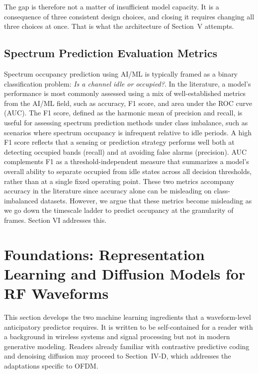 \documentclass[lettersize,journal]{IEEEtran}
\begin{document}
The gap is therefore not a matter of insufficient model capacity. It is
a consequence of three consistent design choices, and closing it
requires changing all three choices at once. That is what the architecture of
Section~V attempts.

\subsection{\textbf{Spectrum Prediction Evaluation Metrics}}
Spectrum occupancy prediction using AI/ML is typically framed as a binary 
classification problem: \textit{Is a channel idle or occupied?}. In 
the literature, a model's performance is most commonly assessed using 
a mix of well-established metrics from the AI/ML field, such as accuracy, 
F1 score, and area under the ROC curve (AUC). The F1 score, defined as 
the harmonic mean of precision and recall, is useful for assessing spectrum 
prediction methods under class imbalance, such as scenarios where spectrum 
occupancy is infrequent relative to idle periods. A high F1 score reflects 
that a sensing or prediction strategy performs well both at 
detecting occupied bands (recall) and at avoiding false alarms (precision). 
AUC complements F1 as a threshold-independent measure that summarizes a 
model's overall ability to separate occupied from idle states across 
all decision thresholds, rather than at a single fixed operating point. 
These two metrics accompany accuracy in the literature since accuracy 
alone can be misleading on class-imbalanced datasets. However, we argue 
that these metrics become misleading as we go down the timescale ladder 
to predict occupancy at the granularity of frames. Section VI addresses this.

\section{\textbf{Foundations: Representation Learning and Diffusion Models for RF Waveforms}}

This section develops the two machine learning ingredients that a
waveform-level anticipatory predictor requires. It is written to be
self-contained for a reader with a background in wireless systems and
signal processing but not in modern generative modeling. Readers already
familiar with contrastive predictive coding and denoising diffusion may
proceed to Section~IV-D, which addresses the adaptations specific to
OFDM.
\end{document}
